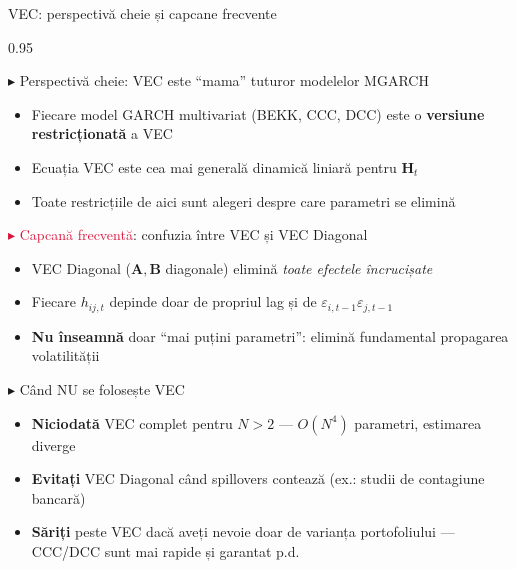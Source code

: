 \documentclass[9pt, aspectratio=169, t]{beamer}
\begin{document}
\begin{frame}{VEC: perspectivă cheie și capcane frecvente}
    \begin{cminipage}{0.95\textwidth}
    \vspace{-2mm}
    {\scriptsize
    \begin{block}{\textcolor{MainBlue}{$\blacktriangleright$ Perspectivă cheie}: VEC este ``mama'' tuturor modelelor MGARCH}
        \begin{itemize}\setlength{\itemsep}{0pt}
            \item Fiecare model GARCH multivariat (BEKK, CCC, DCC) este o \textbf{versiune restricționată} a VEC
            \item Ecuația VEC este cea mai generală dinamică liniară pentru $\mathbf{H}_t$
            \item Toate restricțiile de aici sunt alegeri despre care parametri se elimină
        \end{itemize}
    \end{block}
    \vspace{-2mm}
    \begin{alertblock}{\textcolor{Crimson}{$\blacktriangleright$ Capcană frecventă}: confuzia între VEC și VEC Diagonal}
        \begin{itemize}\setlength{\itemsep}{0pt}
            \item VEC Diagonal ($\mathbf{A}, \mathbf{B}$ diagonale) elimină \textit{toate efectele încrucișate}
            \item Fiecare $h_{ij,t}$ depinde doar de propriul lag și de $\varepsilon_{i,t-1}\varepsilon_{j,t-1}$
            \item \textbf{Nu înseamnă} doar ``mai puțini parametri'': elimină fundamental propagarea volatilității
        \end{itemize}
    \end{alertblock}
    \vspace{-2mm}
    \begin{exampleblock}{\textcolor{Forest}{$\blacktriangleright$ Când NU se folosește VEC}}
        \begin{itemize}\setlength{\itemsep}{0pt}
            \item \textbf{Niciodată} VEC complet pentru $N > 2$ --- $O(N^4)$ parametri, estimarea diverge
            \item \textbf{Evitați} VEC Diagonal când spillovers contează (ex.: studii de contagiune bancară)
            \item \textbf{Săriți} peste VEC dacă aveți nevoie doar de varianța portofoliului --- CCC/DCC sunt mai rapide și garantat p.d.
        \end{itemize}
    \end{exampleblock}
    }
    \end{cminipage}
\end{frame}
\end{document}

